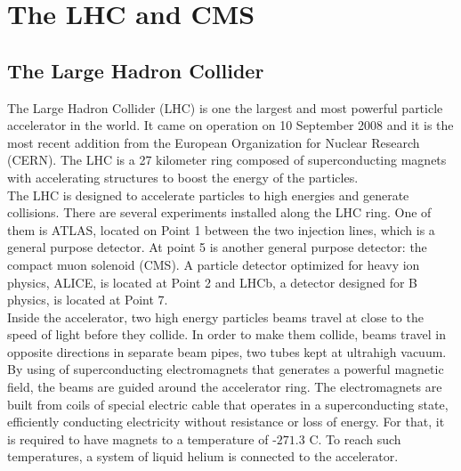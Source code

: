 
\chapter{The LHC and CMS}

\section{The Large Hadron Collider}

The Large Hadron Collider (LHC) is one the largest and most powerful particle accelerator in the world. It came on operation on 10 September 2008 and it is the most recent addition from the European Organization for Nuclear Research (CERN). The LHC is a 27 kilometer ring composed of superconducting magnets with accelerating structures to boost the energy of the particles. \\

The LHC is designed to accelerate particles to high energies and generate collisions. There are several
experiments installed along the LHC ring. One of them is ATLAS, located on Point 1 between the two injection lines, which is a general purpose detector. At point 5 is another general purpose detector: the compact muon solenoid (CMS). A particle detector optimized for heavy ion physics, ALICE, is located at Point 2 and LHCb, a detector designed for B physics, is located at Point 7.\cite{cern1,cern2}
\\

Inside the accelerator, two high energy particles beams travel at
close to the speed of light before they collide. 
In order to make them collide, beams travel in opposite directions in separate beam pipes, 
two tubes kept at ultrahigh vacuum. 
By using of superconducting electromagnets that generates a powerful magnetic field, the beams are guided around the accelerator ring. 
The electromagnets are built from coils of special electric cable that operates in a superconducting state, efficiently conducting electricity without resistance or loss of energy. For that, it is required to have magnets to a temperature of $‑271.3$ C. 
To reach such temperatures, a system of liquid helium is connected to the accelerator.\cite{cern2}

